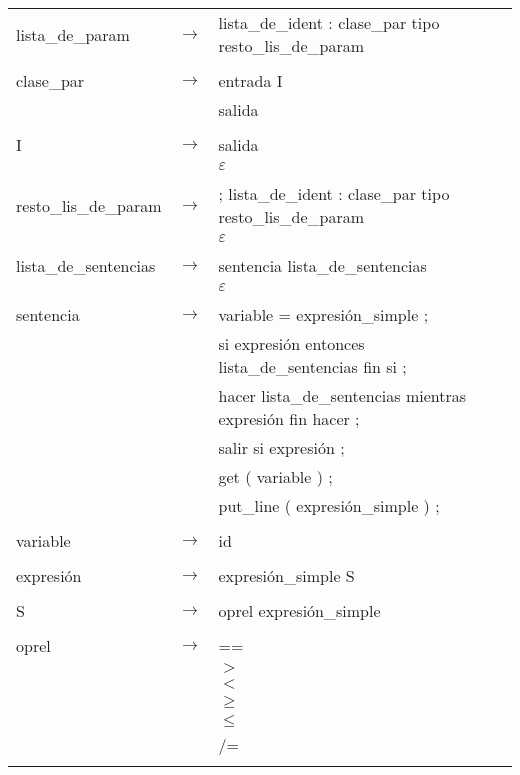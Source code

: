 \documentclass[11pt,twoside,a4paper]{book}
\begin{document}
\begin{tabular}{l c l}
lista\_de\_param &  $ \rightarrow $ & lista\_de\_ident : clase\_par tipo resto\_lis\_de\_param \\
\\

clase\_par & $ \rightarrow $ & entrada I \\
                  & &  salida \\
\\

I & $ \rightarrow $ & salida \\
                  & &  $ \varepsilon $ \\
\\

resto\_lis\_de\_param & $ \rightarrow $ & ; lista\_de\_ident : clase\_par tipo resto\_lis\_de\_param \\
                  & &  $ \varepsilon $ \\
\\

lista\_de\_sentencias & $ \rightarrow $ & sentencia lista\_de\_sentencias \\
                  & &  $ \varepsilon $ \\
\\

sentencia & $ \rightarrow $ & variable = expresi\'{o}n\_simple ; \\
                  & & si expresi\'{o}n entonces lista\_de\_sentencias fin si ; \\
                  & & hacer lista\_de\_sentencias mientras expresi\'{o}n fin hacer ; \\
                  & & salir si expresi\'{o}n ; \\
                  & & get ( variable ) ; \\
                  & & put\_line ( expresi\'{o}n\_simple ) ; \\
\\

variable & $ \rightarrow $ & id \\
\\

expresi\'{o}n &  $ \rightarrow $  & expresi\'{o}n\_simple S \\
\\

S &  $ \rightarrow $  & oprel expresi\'{o}n\_simple \\
\\

oprel &  $ \rightarrow $   & == \\
				  & & $ > $ \\
				  & & $ < $ \\
				  & & $ \geq $ \\ 
				  & & $ \leq $\\
				  & & /= \\
\\


\end{tabular}
\end{document}
